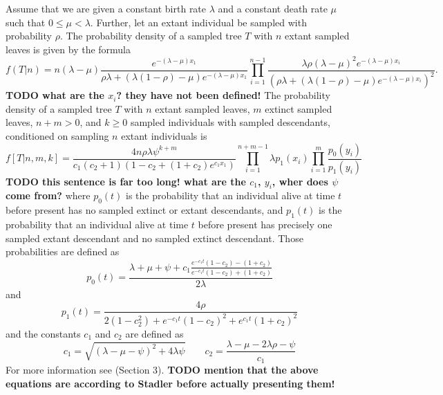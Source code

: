 \documentclass{llncs}
\begin{document}
Assume that we are given a constant birth rate $\lambda$ and a constant death rate $\mu$ such that
$0 \leq \mu < \lambda$. Further, let an extant individual be sampled with
probability $\rho$.  The probability density of a sampled tree $T$ with $n$
extant sampled leaves is given by the formula
%
%
$$f(T|n) = n(\lambda-\mu)\frac{e^{-(\lambda-\mu)x_1}}{\rho\lambda + (\lambda(1 -\rho)-\mu)e^{-(\lambda-\mu)x_1}}\prod_{i=1}^{n-1}
\frac{\lambda\rho(\lambda-\mu)^2e^{-(\lambda-\mu)x_i}}{(\rho\lambda + (\lambda(1-\rho)-\mu)e^{-(\lambda-\mu)x_i})^2}.$$
%
%
{\bf TODO what are the $x_i$? they have not been defined!} 
The probability density of a sampled tree $T$ with $n$ extant sampled leaves,
$m$ extinct sampled leaves, $n+m > 0$, and $k \geq 0$ sampled individuals with
sampled descendants, conditioned on sampling $n$ extant individuals is
%
%
$$f[T|n,m,k] = \frac{4n\rho\lambda\psi^{k+m}}{c_1(c_2+1)(1-c_2+(1+c_2)e^{c_1x_1})}\prod_{i=1}^{n+m-1}\lambda p_1(x_i)\prod_{i=1}^{m}\frac{p_0(y_i)}{p_1(y_i)}$$
%
%
{\bf TODO this sentence is far too long! what are the $c_1$, $y_i$, wher does $\psi$ come from?} where $p_0(t)$ is the probability that an individual alive at time $t$ before
present has no sampled extinct or extant descendants, and $p_1(t)$ is the
probability that an individual alive at time $t$ before present has precisely
one sampled extant descendant and no sampled extinct descendant. Those probabilities
are defined as
%
$$p_0(t) = \frac{\lambda+\mu+\psi+c_1\frac{e^{-c_1 t}(1-c_2)-(1+c_2)}{e^{-c_1t}(1-c_2)+(1+c_2)}}{2\lambda}$$
and
$$p_1(t) = \frac{4\rho}{2(1-c_2^2)+e^{-c_1t}(1-c_2)^2+e^{c_1t}(1+c_2)^2}$$
%
and the constants $c_1$ and $c_2$ are defined as
%
$$c_1 = \sqrt{(\lambda-\mu-\psi)^2 + 4\lambda\psi} \qquad c_2 = \frac{\lambda-\mu-2\lambda\rho-\psi}{c_1}$$
%
For more information see \cite{Stadler2010} (Section 3).
{\bf TODO mention that the above equations are according to Stadler before actually presenting them!} 
\end{document}
